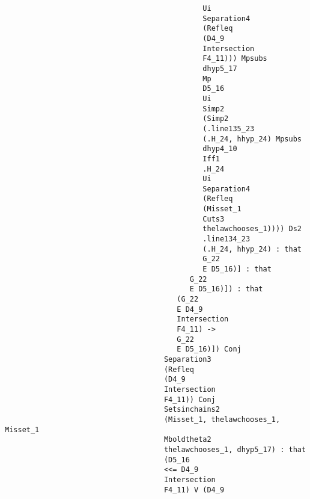 \documentclass[12pt]{article}
\begin{document}
\begin{verbatim}
                                              Ui 
                                              Separation4 
                                              (Refleq 
                                              (D4_9 
                                              Intersection 
                                              F4_11))) Mpsubs 
                                              dhyp5_17 
                                              Mp 
                                              D5_16 
                                              Ui 
                                              Simp2 
                                              (Simp2 
                                              (.line135_23 
                                              (.H_24, hhyp_24) Mpsubs 
                                              dhyp4_10 
                                              Iff1 
                                              .H_24 
                                              Ui 
                                              Separation4 
                                              (Refleq 
                                              (Misset_1 
                                              Cuts3 
                                              thelawchooses_1)))) Ds2 
                                              .line134_23 
                                              (.H_24, hhyp_24) : that 
                                              G_22 
                                              E D5_16)] : that 
                                           G_22 
                                           E D5_16)]) : that 
                                        (G_22 
                                        E D4_9 
                                        Intersection 
                                        F4_11) -> 
                                        G_22 
                                        E D5_16)]) Conj 
                                     Separation3 
                                     (Refleq 
                                     (D4_9 
                                     Intersection 
                                     F4_11)) Conj 
                                     Setsinchains2 
                                     (Misset_1, thelawchooses_1, Misset_1 
                                     Mboldtheta2 
                                     thelawchooses_1, dhyp5_17) : that 
                                     (D5_16 
                                     <<= D4_9 
                                     Intersection 
                                     F4_11) V (D4_9 

\end{verbatim}
\end{document}
